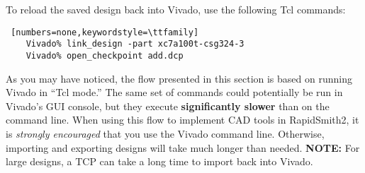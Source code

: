 \noindent To reload the saved design back into Vivado, use the following Tcl
commands:

\begin{lstlisting} [numbers=none,keywordstyle=\ttfamily]
	Vivado% link_design -part xc7a100t-csg324-3
	Vivado% open_checkpoint add.dcp
\end{lstlisting}

As you may have noticed, the flow presented in this section is based on running
Vivado in ``Tcl mode.'' The same set of commands could potentially be run in
Vivado's GUI console, but they execute \textbf{significantly slower} than on
the command line. When using this flow to implement CAD tools in RapidSmith2,
it is \textit{strongly encouraged} that you use the Vivado command line.
Otherwise, importing and exporting designs will take much longer than needed.
\textbf{NOTE:} For large designs, a TCP can take a long time to import back into
Vivado. 
